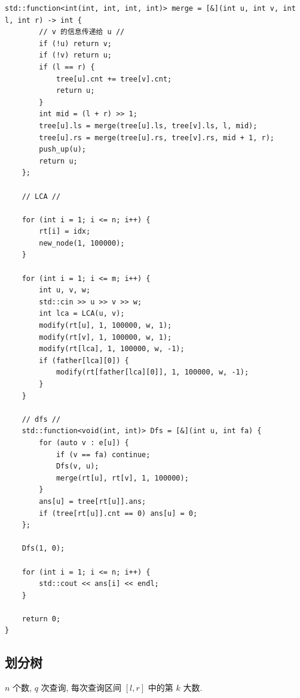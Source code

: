 \documentclass[UTF8, a4paper, titlepage, twoside]{ctexart}
\begin{document}
\begin{lstlisting}[style=cpp]
    std::function<int(int, int, int, int)> merge = [&](int u, int v, int l, int r) -> int {
        // v 的信息传递给 u //
        if (!u) return v;
        if (!v) return u;
        if (l == r) {
            tree[u].cnt += tree[v].cnt;
            return u;
        }
        int mid = (l + r) >> 1;
        tree[u].ls = merge(tree[u].ls, tree[v].ls, l, mid);
        tree[u].rs = merge(tree[u].rs, tree[v].rs, mid + 1, r);
        push_up(u);
        return u;
    };

    // LCA //

    for (int i = 1; i <= n; i++) {
        rt[i] = idx;
        new_node(1, 100000);
    }

    for (int i = 1; i <= m; i++) {
        int u, v, w;
        std::cin >> u >> v >> w;
        int lca = LCA(u, v);
        modify(rt[u], 1, 100000, w, 1);
        modify(rt[v], 1, 100000, w, 1);
        modify(rt[lca], 1, 100000, w, -1);
        if (father[lca][0]) {
            modify(rt[father[lca][0]], 1, 100000, w, -1);
        }
    }

    // dfs //
    std::function<void(int, int)> Dfs = [&](int u, int fa) {
        for (auto v : e[u]) {
            if (v == fa) continue;
            Dfs(v, u);
            merge(rt[u], rt[v], 1, 100000);
        }
        ans[u] = tree[rt[u]].ans;
        if (tree[rt[u]].cnt == 0) ans[u] = 0;
    };

    Dfs(1, 0);

    for (int i = 1; i <= n; i++) {
        std::cout << ans[i] << endl;
    }

    return 0;
}	
\end{lstlisting}


\subsection{ 划分树 }

$n$ 个数, $q$ 次查询, 每次查询区间 $[l, r]$ 中的第 $k$ 大数.  
\end{document}
